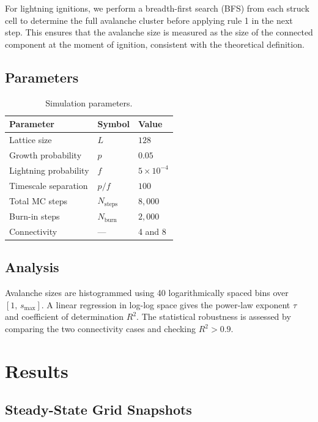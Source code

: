 \documentclass[12pt,a4paper]{article}
\begin{document}
For lightning ignitions, we perform a breadth-first search (BFS) from each
struck cell to determine the full avalanche cluster before applying rule 1
in the next step. This ensures that the avalanche size is measured as the
size of the connected component at the moment of ignition, consistent with
the theoretical definition.

\subsection{Parameters}
\begin{table}[H]
\centering
\caption{Simulation parameters.}
\label{tab:params}
\begin{tabular}{lll}
\toprule
Parameter & Symbol & Value \\
\midrule
Lattice size       & $L$           & $128$ \\
Growth probability & $p$           & $0.05$ \\
Lightning probability & $f$        & $5\times10^{-4}$ \\
Timescale separation & $p/f$       & $100$ \\
Total MC steps     & $N_\text{steps}$ & $8{,}000$ \\
Burn-in steps      & $N_\text{burn}$  & $2{,}000$ \\
Connectivity       & ---           & 4 and 8 \\
\bottomrule
\end{tabular}
\end{table}

\subsection{Analysis}
Avalanche sizes are histogrammed using 40 logarithmically spaced bins over
$[1,\, s_{\max}]$. A linear regression in log-log space gives the
power-law exponent $\tau$ and coefficient of determination $R^2$. The
statistical robustness is assessed by comparing the two connectivity cases
and checking $R^2 > 0.9$.

\section{Results}
\label{sec:results}

\subsection{Steady-State Grid Snapshots}
\end{document}
